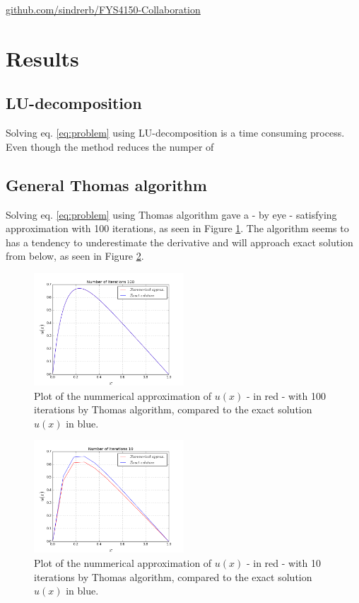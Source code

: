 \documentclass[twoside,twocolumn]{article}
\begin{document}
\begin{center}
 \href{https://github.com/sindrerb/FYS4150-Collaboration}{github.com/sindrerb/FYS4150-Collaboration}
\end{center}

\section{Results}
\subsection{LU-decomposition}
Solving eq. \ref{eq:problem} using LU-decomposition is a time consuming process. Even though the method reduces the numper of 
\subsection{General Thomas algorithm}
Solving eq. \ref{eq:problem} using Thomas algorithm gave a - by eye - satisfying approximation with 100 iterations, as seen in Figure \ref{fig:Thomas1E2}. The algorithm seems to has a tendency to underestimate the derivative and will approach exact solution from below, as seen in Figure \ref{fig:Thomas10}.

\begin{figure}[htp]
\includegraphics[width=0.5\textwidth]{./figures/b-run1e2.png} 
\caption{Plot of the nummerical approximation of $u(x)$ - in red - with 100 iterations by Thomas algorithm, compared to the exact solution $u(x)$ in blue.} \label{fig:Thomas1E2}
\end{figure}

\begin{figure}[htp]
\includegraphics[width=0.5\textwidth]{./figures/b-run10.png} 
\caption{Plot of the nummerical approximation of $u(x)$ - in red - with 10 iterations by Thomas algorithm, compared to the exact solution $u(x)$ in blue.} \label{fig:Thomas10}
\end{figure}
\end{document}
